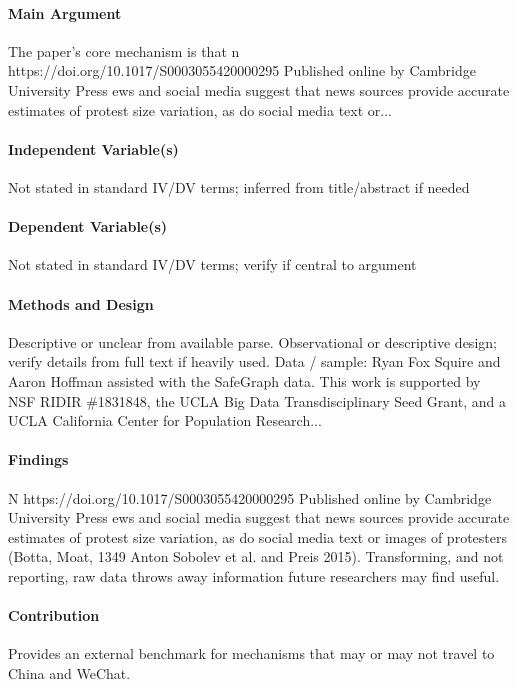 \documentclass[12pt]{article}
\begin{document}
\paragraph{Main Argument} The paper's core mechanism is that n https://doi.org/10.1017/S0003055420000295 Published online by Cambridge University Press ews and social media suggest that news sources provide accurate estimates of protest size variation, as do social media text or...

\paragraph{Independent Variable(s)} Not stated in standard IV/DV terms; inferred from title/abstract if needed

\paragraph{Dependent Variable(s)} Not stated in standard IV/DV terms; verify if central to argument

\paragraph{Methods and Design} Descriptive or unclear from available parse. Observational or descriptive design; verify details from full text if heavily used. Data / sample: Ryan Fox Squire and Aaron Hoffman assisted with the SafeGraph data. This work is supported by NSF RIDIR \#1831848, the UCLA Big Data Transdisciplinary Seed Grant, and a UCLA California Center for Population Research...

\paragraph{Findings} N https://doi.org/10.1017/S0003055420000295 Published online by Cambridge University Press ews and social media suggest that news sources provide accurate estimates of protest size variation, as do social media text or images of protesters (Botta, Moat, 1349 Anton Sobolev et al. and Preis 2015). Transforming, and not reporting, raw data throws away information future researchers may find useful.

\paragraph{Contribution} Provides an external benchmark for mechanisms that may or may not travel to China and WeChat.
\end{document}
